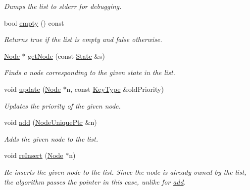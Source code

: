 \begin{DoxyCompactItemize}
\begin{DoxyCompactList}\small\item\em Dumps the list to {\ttfamily stderr} for debugging. \end{DoxyCompactList}\item 
bool \hyperlink{structslb_1_1core_1_1sb_1_1OpenClosedList_a58044b6938e07f27f8b8d3391a784228}{empty} () const 
\begin{DoxyCompactList}\small\item\em Returns {\ttfamily true} if the list is empty and {\ttfamily false} otherwise. \end{DoxyCompactList}\item 
\hyperlink{structslb_1_1core_1_1sb_1_1OpenClosedList_ab4cf0f882c69f162e0eccf4abe5ad27e}{Node} $\ast$ \hyperlink{structslb_1_1core_1_1sb_1_1OpenClosedList_a4a30ec461bceda48242b332da06495d7}{get\+Node} (const \hyperlink{structslb_1_1core_1_1sb_1_1OpenClosedList_abf97b928a4672403ae4cbc256992d629}{State} \&s)
\begin{DoxyCompactList}\small\item\em Finds a node corresponding to the given state in the list. \end{DoxyCompactList}\item 
void \hyperlink{structslb_1_1core_1_1sb_1_1OpenClosedList_a43e0120be79b7ff0393bfab3549a2752}{update} (\hyperlink{structslb_1_1core_1_1sb_1_1OpenClosedList_ab4cf0f882c69f162e0eccf4abe5ad27e}{Node} $\ast$n, const \hyperlink{structslb_1_1core_1_1sb_1_1OpenClosedList_a9ffd5756297080af110c9d55b588a34e}{Key\+Type} \&old\+Priority)
\begin{DoxyCompactList}\small\item\em Updates the priority of the given node. \end{DoxyCompactList}\item 
void \hyperlink{structslb_1_1core_1_1sb_1_1OpenClosedList_ad4959bb4917944d66491c61de441b18c}{add} (\hyperlink{structslb_1_1core_1_1sb_1_1OpenClosedList_a2e2e18ca368c353ff032fa3f3dd8f1e9}{Node\+Unique\+Ptr} \&n)
\begin{DoxyCompactList}\small\item\em Adds the given node to the list. \end{DoxyCompactList}\item 
void \hyperlink{structslb_1_1core_1_1sb_1_1OpenClosedList_a98b4bcf5533ed974d71b281101363056}{re\+Insert} (\hyperlink{structslb_1_1core_1_1sb_1_1OpenClosedList_ab4cf0f882c69f162e0eccf4abe5ad27e}{Node} $\ast$n)
\begin{DoxyCompactList}\small\item\em Re-\/inserts the given node to the list. Since the node is already owned by the list, the algorithm passes the pointer in this case, unlike for \hyperlink{structslb_1_1core_1_1sb_1_1OpenClosedList_ad4959bb4917944d66491c61de441b18c}{add}. \end{DoxyCompactList}\item 

\end{DoxyCompactItemize}
